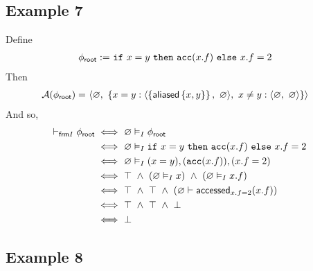 \newpage
\subsection*{Example 7}

Define
\begin{align*}
{\phi_\textsf{root}} := & \
\texttt{if} \ x = y \ \texttt{then} \ \texttt{acc}(x.f) \ \texttt{else} \ x.f = 2
\end{align*}
Then
\begin{align*}
\mathcal{A}({\phi_\textsf{root}}) = & \
\langle \varnothing ,\ \left\{ 
    x = y : \langle \left\{  \textsf{aliased}\left\{ x,y \right\}  \right\} ,\ \varnothing \rangle ,\
    x \neq y : \langle \varnothing ,\ \varnothing \rangle
   \right\} \rangle
\end{align*}
And so,
\begin{align*}
\vdash_{\textsf{frm}I} {\phi_\textsf{root}}
\iff & \
\varnothing \vDash_I {\phi_\textsf{root}}
\\ \iff & \
\varnothing \vDash_I \texttt{if} \ x = y \ \texttt{then} \ \texttt{acc}(x.f) \ \texttt{else} \ x.f = 2
\\ \iff & \
\varnothing \vDash_I (x = y), (\texttt{acc}(x.f)), (x.f = 2)
\\ \iff & \
\top \ \land \ (\varnothing \vDash_I x) \ \land \ (\varnothing \vDash_I x.f)
\\ \iff & \
\top \ \land \ \top \ \land \ (\varnothing \vdash \textsf{accessed}_{x.f = 2}(x.f))
\\ \iff & \
\top \ \land \ \top \ \land \ \bot
\\ \iff & \
\bot
\end{align*}

\newpage
\subsection*{Example 8}

\newcommand{\aliasChoice}{\tsf{aliasChoice}}

